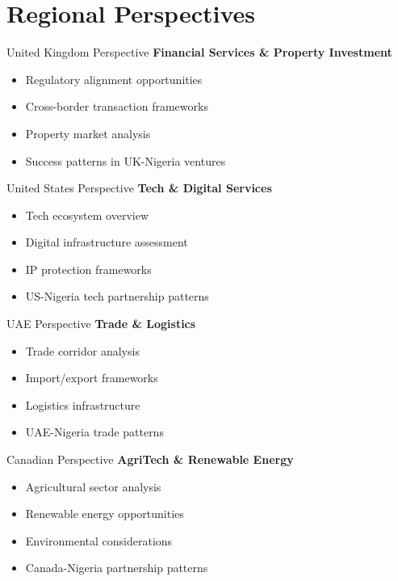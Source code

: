 \section{Regional Perspectives}

\begin{regionalbox}{United Kingdom Perspective}
\textbf{Financial Services \& Property Investment}
\begin{itemize}
    \item Regulatory alignment opportunities
    \item Cross-border transaction frameworks
    \item Property market analysis
    \item Success patterns in UK-Nigeria ventures
\end{itemize}
\end{regionalbox}

\begin{regionalbox}{United States Perspective}
\textbf{Tech \& Digital Services}
\begin{itemize}
    \item Tech ecosystem overview
    \item Digital infrastructure assessment
    \item IP protection frameworks
    \item US-Nigeria tech partnership patterns
\end{itemize}
\end{regionalbox}

\begin{regionalbox}{UAE Perspective}
\textbf{Trade \& Logistics}
\begin{itemize}
    \item Trade corridor analysis
    \item Import/export frameworks
    \item Logistics infrastructure
    \item UAE-Nigeria trade patterns
\end{itemize}
\end{regionalbox}

\begin{regionalbox}{Canadian Perspective}
\textbf{AgriTech \& Renewable Energy}
\begin{itemize}
    \item Agricultural sector analysis
    \item Renewable energy opportunities
    \item Environmental considerations
    \item Canada-Nigeria partnership patterns
\end{itemize}
\end{regionalbox}

